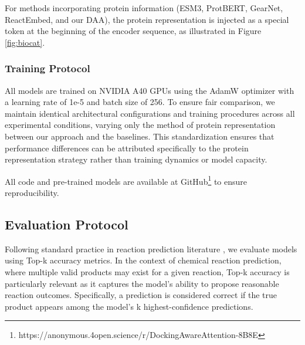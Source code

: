 \documentclass[sigconf]{acmart}
\begin{document}
For methods incorporating protein information (ESM3, ProtBERT, GearNet, ReactEmbed, and our DAA), the protein representation is injected as a special token at the beginning of the encoder sequence, as illustrated in Figure \ref{fig:biocat}. 

\subsubsection{Training Protocol}
All models are trained on NVIDIA A40 GPUs using the AdamW optimizer with a learning rate of 1e-5 and batch size of 256. To ensure fair comparison, we maintain identical architectural configurations and training procedures across all experimental conditions, varying only the method of protein representation between our approach and the baselines. This standardization ensures that performance differences can be attributed specifically to the protein representation strategy rather than training dynamics or model capacity.

All code and pre-trained models are available at GitHub\footnote{https://anonymous.4open.science/r/DockingAwareAttention-8B8E} to ensure reproducibility.




\subsection{Evaluation Protocol}
\label{sec:evaluation}
Following standard practice in reaction prediction literature \cite{Chen2023,kreutter2021predicting,schwaller2019molecular,gricourt2024artificial,Probst2022}, we evaluate models using Top-k accuracy metrics. In the context of chemical reaction prediction, where multiple valid products may exist for a given reaction, Top-k accuracy is particularly relevant as it captures the model's ability to propose reasonable reaction outcomes. Specifically, a prediction is considered correct if the true product appears among the model's k highest-confidence predictions.
\end{document}
